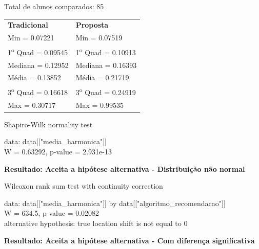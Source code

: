 \noindent
Total de alunos comparados: 85

\begin{table}[h]
\begin{tabular}{p{}p{}}
\textbf{Tradicional} & \textbf{Proposta}\\
Min = 0.07221 & Min = 0.07519\\
1\textsuperscript{o} Quad = 0.09545 & 1\textsuperscript{o} Quad = 0.10913\\
Mediana = 0.12952 & Mediana = 0.16393\\
Média = 0.13852 & Média = 0.21719\\
3\textsuperscript{o} Quad = 0.16618 & 3\textsuperscript{o} Quad = 0.24919\\
Max = 0.30717 & Max = 0.99535\\
\end{tabular}
\end{table}

Shapiro-Wilk normality test

\noindent
data:  data[["media\_harmonica"]]\\
W = 0.63292, p-value = 2.931e-13

\noindent
\textbf{Resultado: Aceita a hipótese alternativa - Distribuição não normal}

Wilcoxon rank sum test with continuity correction

\noindent
data:  data[["media\_harmonica"]] by data[["algoritmo\_recomendacao"]]\\
W = 634.5, p-value = 0.02082\\
alternative hypothesis: true location shift is not equal to 0

\noindent
\textbf{Resultado: Aceita a hipótese alternativa - Com diferença significativa}
